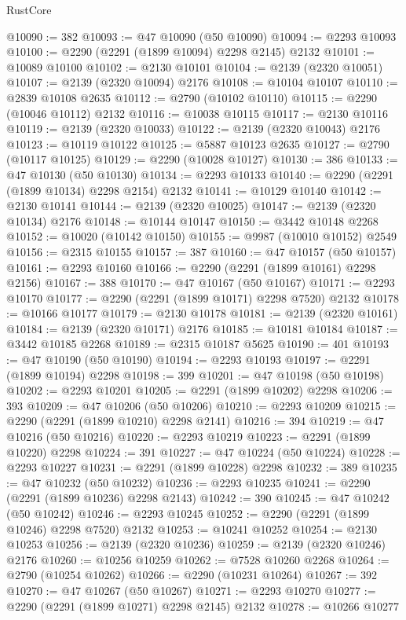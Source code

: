 \begin{lexlean}{RustCore}
\begin{coremodule}
@10090 := 382
@10093 := @47 @10090 (@50 @10090)
@10094 := @2293 @10093
@10100 := @2290 (@2291 (@1899 @10094) @2298 @2145) @2132
@10101 := @10089 @10100
@10102 := @2130 @10101
@10104 := @2139 (@2320 @10051)
@10107 := @2139 (@2320 @10094) @2176
@10108 := @10104 @10107
@10110 := @2839 @10108 @2635
@10112 := @2790 (@10102 @10110)
@10115 := @2290 (@10046 @10112) @2132
@10116 := @10038 @10115
@10117 := @2130 @10116
@10119 := @2139 (@2320 @10033)
@10122 := @2139 (@2320 @10043) @2176
@10123 := @10119 @10122
@10125 := @5887 @10123 @2635
@10127 := @2790 (@10117 @10125)
@10129 := @2290 (@10028 @10127)
@10130 := 386
@10133 := @47 @10130 (@50 @10130)
@10134 := @2293 @10133
@10140 := @2290 (@2291 (@1899 @10134) @2298 @2154) @2132
@10141 := @10129 @10140
@10142 := @2130 @10141
@10144 := @2139 (@2320 @10025)
@10147 := @2139 (@2320 @10134) @2176
@10148 := @10144 @10147
@10150 := @3442 @10148 @2268
@10152 := @10020 (@10142 @10150)
@10155 := @9987 (@10010 @10152) @2549
@10156 := @2315 @10155
@10157 := 387
@10160 := @47 @10157 (@50 @10157)
@10161 := @2293 @10160
@10166 := @2290 (@2291 (@1899 @10161) @2298 @2156)
@10167 := 388
@10170 := @47 @10167 (@50 @10167)
@10171 := @2293 @10170
@10177 := @2290 (@2291 (@1899 @10171) @2298 @7520) @2132
@10178 := @10166 @10177
@10179 := @2130 @10178
@10181 := @2139 (@2320 @10161)
@10184 := @2139 (@2320 @10171) @2176
@10185 := @10181 @10184
@10187 := @3442 @10185 @2268
@10189 := @2315 @10187 @5625
@10190 := 401
@10193 := @47 @10190 (@50 @10190)
@10194 := @2293 @10193
@10197 := @2291 (@1899 @10194) @2298
@10198 := 399
@10201 := @47 @10198 (@50 @10198)
@10202 := @2293 @10201
@10205 := @2291 (@1899 @10202) @2298
@10206 := 393
@10209 := @47 @10206 (@50 @10206)
@10210 := @2293 @10209
@10215 := @2290 (@2291 (@1899 @10210) @2298 @2141)
@10216 := 394
@10219 := @47 @10216 (@50 @10216)
@10220 := @2293 @10219
@10223 := @2291 (@1899 @10220) @2298
@10224 := 391
@10227 := @47 @10224 (@50 @10224)
@10228 := @2293 @10227
@10231 := @2291 (@1899 @10228) @2298
@10232 := 389
@10235 := @47 @10232 (@50 @10232)
@10236 := @2293 @10235
@10241 := @2290 (@2291 (@1899 @10236) @2298 @2143)
@10242 := 390
@10245 := @47 @10242 (@50 @10242)
@10246 := @2293 @10245
@10252 := @2290 (@2291 (@1899 @10246) @2298 @7520) @2132
@10253 := @10241 @10252
@10254 := @2130 @10253
@10256 := @2139 (@2320 @10236)
@10259 := @2139 (@2320 @10246) @2176
@10260 := @10256 @10259
@10262 := @7528 @10260 @2268
@10264 := @2790 (@10254 @10262)
@10266 := @2290 (@10231 @10264)
@10267 := 392
@10270 := @47 @10267 (@50 @10267)
@10271 := @2293 @10270
@10277 := @2290 (@2291 (@1899 @10271) @2298 @2145) @2132
@10278 := @10266 @10277

\end{coremodule}
\end{lexlean}
